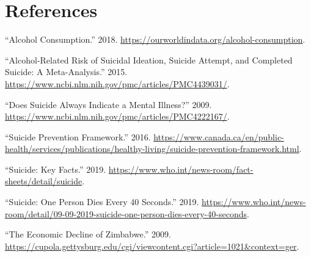 \documentclass[]{article}
\begin{document}
\newpage

\section*{References}\label{references}

\hypertarget{refs}{}
\hypertarget{ref-russia2018}{}
``Alcohol Consumption.'' 2018.
\url{https://ourworldindata.org/alcohol-consumption}.

\hypertarget{ref-ideation2015}{}
``Alcohol-Related Risk of Suicidal Ideation, Suicide Attempt, and
Completed Suicide: A Meta-Analysis.'' 2015.
\url{https://www.ncbi.nlm.nih.gov/pmc/articles/PMC4439031/}.

\hypertarget{ref-mental2009}{}
``Does Suicide Always Indicate a Mental Illness?'' 2009.
\url{https://www.ncbi.nlm.nih.gov/pmc/articles/PMC4222167/}.

\hypertarget{ref-framework2016}{}
``Suicide Prevention Framework.'' 2016.
\url{https://www.canada.ca/en/public-health/services/publications/healthy-living/suicide-prevention-framework.html}.

\hypertarget{ref-stats2019}{}
``Suicide: Key Facts.'' 2019.
\url{https://www.who.int/news-room/fact-sheets/detail/suicide}.

\hypertarget{ref-who2019}{}
``Suicide: One Person Dies Every 40 Seconds.'' 2019.
\url{https://www.who.int/news-room/detail/09-09-2019-suicide-one-person-dies-every-40-seconds}.

\hypertarget{ref-zimbabwe2009}{}
``The Economic Decline of Zimbabwe.'' 2009.
\url{https://cupola.gettysburg.edu/cgi/viewcontent.cgi?article=1021\&context=ger}.
\end{document}
